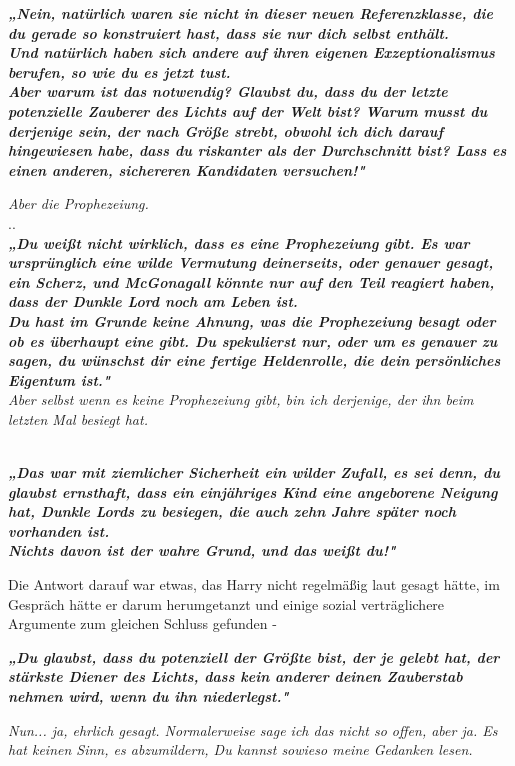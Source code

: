 {\textbf{\emph{„Nein, natürlich waren sie nicht in dieser neuen Referenzklasse, die du gerade so konstruiert hast, dass sie nur dich selbst enthält.\\ Und natürlich haben sich andere auf ihren eigenen Exzeptionalismus berufen, so wie du es jetzt tust.}}\\ \textbf{\emph{\hfill\break Aber warum ist das notwendig? Glaubst du, dass du der letzte potenzielle Zauberer des Lichts auf der Welt bist? Warum musst du derjenige sein, der nach Größe strebt, obwohl ich dich darauf hingewiesen habe, dass du riskanter als der Durchschnitt bist? Lass es einen anderen, sichereren Kandidaten versuchen!"}}

\emph{Aber die Prophezeiung.}\\ ..\\ \textbf{\emph{„Du weißt nicht wirklich, dass es eine Prophezeiung gibt. Es war ursprünglich eine wilde Vermutung deinerseits, oder genauer gesagt, ein Scherz, und McGonagall könnte nur auf den Teil reagiert haben, dass der Dunkle Lord noch am Leben ist.\\ Du hast im Grunde keine Ahnung, was die Prophezeiung besagt oder ob es überhaupt eine gibt. Du spekulierst nur, oder um es genauer zu sagen, du wünschst dir eine fertige Heldenrolle, die dein persönliches Eigentum ist."}}\\ \emph{\hfill\break Aber selbst wenn es keine Prophezeiung gibt, bin ich derjenige, der ihn beim letzten Mal besiegt hat.\\ }\strut \\ \textbf{\emph{„Das war mit ziemlicher Sicherheit ein wilder Zufall, es sei denn, du glaubst ernsthaft, dass ein einjähriges Kind eine angeborene Neigung hat, Dunkle Lords zu besiegen, die auch zehn Jahre später noch vorhanden ist.\\ }} \textbf{\emph{Nichts davon ist der wahre Grund, und das weißt du!"}}

Die Antwort darauf war etwas, das Harry nicht regelmäßig laut gesagt hätte, im Gespräch hätte er darum herumgetanzt und einige sozial verträglichere Argumente zum gleichen Schluss gefunden -

\textbf{\emph{„Du glaubst, dass du potenziell der Größte bist, der je gelebt hat, der stärkste Diener des Lichts, dass kein anderer deinen Zauberstab nehmen wird, wenn du ihn niederlegst."}}

\emph{Nun... ja, ehrlich gesagt. Normalerweise sage ich das nicht so offen, aber ja. Es hat keinen Sinn, es abzumildern, Du kannst sowieso meine Gedanken lesen.}

}
